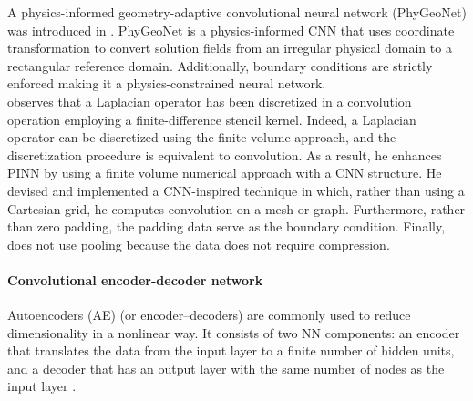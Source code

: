 \documentclass[pdflatex,sn-basic]{sn-jnl}%
\theoremstyle{thmstyleone}%
\theoremstyle{thmstyletwo}%
\theoremstyle{thmstylethree}%
\begin{document}
A physics-informed geometry-adaptive convolutional neural network (PhyGeoNet) was introduced in \cite{Gao2021_PhygeonetPhysicsInformed_SunGSW}.
PhyGeoNet is a  physics-informed CNN that uses coordinate transformation to convert solution fields from an irregular physical domain to a rectangular reference domain.
%
Additionally, boundary conditions are strictly enforced making it a physics-constrained neural network.
%
\\
\noindent
%
\cite{Fan2021_HighEfficientHybrid_Fan}  observes that a Laplacian operator has been discretized in a convolution operation employing a finite-difference stencil kernel.
Indeed, a Laplacian operator can be discretized using the finite volume approach, and the discretization procedure is equivalent to convolution.
%
As a result, he enhances PINN by using a finite volume numerical approach with a CNN structure. He devised and implemented a CNN-inspired technique in which, rather than using a Cartesian grid, he computes convolution on a mesh or graph.
Furthermore, rather than zero padding, the padding data serve as the boundary condition.
Finally, \cite{Fan2021_HighEfficientHybrid_Fan}  does not use pooling because the data does not require compression. 



\paragraph{Convolutional encoder-decoder network}
%
Autoencoders (AE) (or encoder–decoders) are commonly used to reduce dimensionality in a nonlinear way. 
It consists of two NN components: an encoder that translates the data from the input layer to a finite number of hidden units, and a decoder that has an output layer with the same number of nodes as the input layer
\citep{Che2018_RiseDeepLearning_EngCEW}. %
\end{document}
